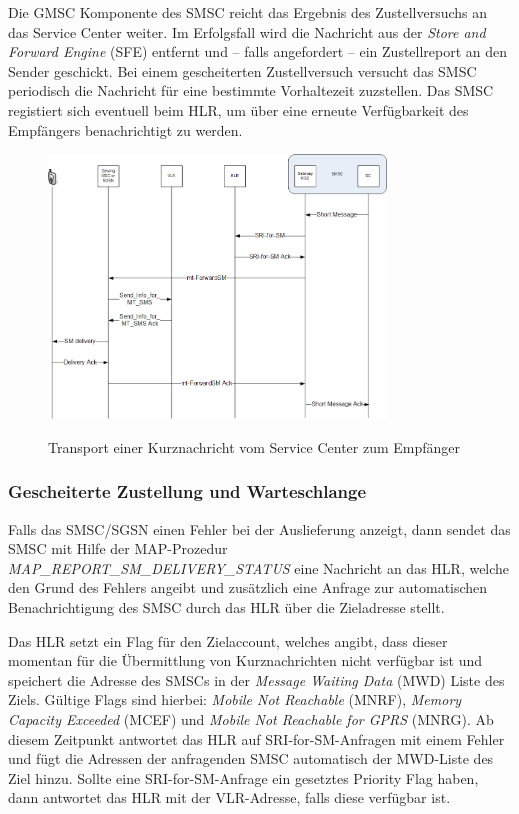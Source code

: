 \documentclass[german,12pt,a4paper]{article}
\begin{document}
Die GMSC Komponente des SMSC reicht das Ergebnis des Zustellversuchs an das Service Center weiter. Im
Erfolgsfall wird die Nachricht aus der \textit{Store and Forward Engine} (SFE) entfernt und -- falls angefordert --
ein Zustellreport an den Sender geschickt. Bei einem gescheiterten Zustellversuch versucht das SMSC
periodisch die Nachricht für eine bestimmte Vorhaltezeit zuzstellen. Das SMSC registiert sich eventuell 
beim HLR, um über eine erneute Verfügbarkeit des Empfängers benachrichtigt zu werden.

\begin{figure}[htm]
    \centering
	\includegraphics[width=0.8\textwidth]{img/mt-forward-sm.png}
    \label{fig:mt-forward-sm}
    \caption{Transport einer Kurznachricht vom Service Center zum Empfänger}
\end{figure}	

\subsubsection{Gescheiterte Zustellung und Warteschlange}
Falls das SMSC/SGSN einen Fehler bei der Auslieferung anzeigt, dann sendet das SMSC mit Hilfe der 
MAP-Prozedur \textit{MAP\_REPORT\_SM\_DELIVERY\_STATUS} eine Nachricht an das HLR, welche den Grund des Fehlers
angeibt und zusätzlich eine Anfrage zur automatischen Benachrichtigung des SMSC durch das HLR über die 
Zieladresse stellt.

Das HLR setzt ein Flag für den Zielaccount, welches angibt, dass dieser momentan für die Übermittlung von 
Kurznachrichten nicht verfügbar ist und speichert die Adresse des SMSCs in der \textit{Message Waiting Data} (MWD) 
Liste des Ziels. Gültige Flags sind hierbei: \textit{Mobile Not Reachable} (MNRF), \textit{Memory Capacity Exceeded} (MCEF) und
\textit{Mobile Not Reachable for GPRS} (MNRG). Ab diesem Zeitpunkt antwortet das HLR auf SRI-for-SM-Anfragen mit 
einem Fehler und fügt die Adressen der anfragenden SMSC automatisch der MWD-Liste des Ziel hinzu. Sollte 
eine SRI-for-SM-Anfrage ein gesetztes Priority Flag haben, dann antwortet das HLR mit der VLR-Adresse, 
falls diese verfügbar ist.
\end{document}
